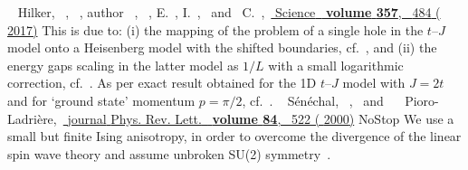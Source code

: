 \documentclass[%
 reprint,
 amsmath,amssymb,
 aps,
prl,
]{revtex4-1}
\begin{document}
\begin{thebibliography}{59}
      \BibitemOpen
       { {\ \bibnamefont
      {Hilker}},  {~},
       {~}, \bibinfo
      {author} {~}, 
      {~},  {\bibfnamefont
      {E.}~},  {\bibfnamefont
      {I.}~}, \ and\  {\bibfnamefont
      {C.}~},\ }\href {\doibase 10.1126/science.aam8990}
      { { {Science}\ }\textbf {\bibinfo
      {volume} {357}},\  {484} (
      {2017})}%
      \BibitemOpen
       {This is due to: (i) the mapping of the problem of a single
      hole in the $t$--$J$ model onto a Heisenberg model with the shifted
      boundaries, cf.~\cite {Sorella1998}, and (ii) the energy gaps scaling in the
      latter model as $1/L$ with a small logarithmic correction, cf.~\cite
      {Haas1998}.}%
      \BibitemOpen
       {As per exact result obtained for the 1D $t$--$J$ model with
      $J=2t$ and for `ground state' momentum $p=\pi /2$, cf.~\cite
      {Sorella1996}.}%
      \BibitemOpen
       { {~\bibnamefont
      {S\'en\'echal}},  {~},
      \ and\  {~\bibnamefont
      {Pioro-Ladri\`ere}},\ }\href {\doibase 10.1103/PhysRevLett.84.522} {\bibfield
       {journal} { {Phys. Rev. Lett.}\ }\textbf {\bibinfo
      {volume} {84}},\  {522} ( {2000})}\BibitemShut
      {NoStop}%
      \BibitemOpen
       {We use a small but finite Ising anisotropy, in order to
      overcome the divergence of the linear spin wave theory and assume unbroken
      SU(2) symmetry~\cite {Brink1998}.}%
      \BibitemOpen
       { {~\bibnamefont
}}
\end{thebibliography}
\end{document}
